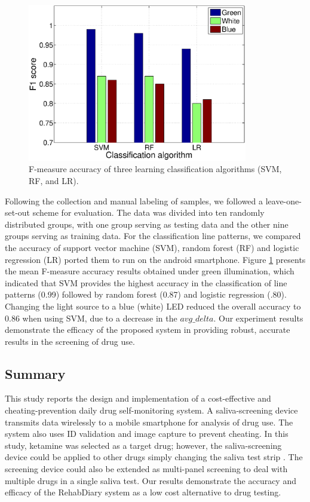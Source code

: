 \begin{figure}[ht]
\begin{center}
\includegraphics[height=6.9cm]{image/ket/detection_accuracy.eps}
\caption{F-measure accuracy of three learning classification algorithms (SVM, RF, and LR).}
\label{fig:detection_accuracy}
\end{center}
\end{figure}

Following the collection and manual labeling of samples, we followed a leave-one-set-out scheme for evaluation. The data was divided into ten randomly distributed groups, with one group serving as testing data and the other nine groups serving as training data. For the classification line patterns, we compared the accuracy of support vector machine (SVM), random forest (RF) and logistic regression (LR) ported them to run on the android smartphone. Figure \ref{fig:detection_accuracy} presents the mean F-measure accuracy results obtained under green illumination, which indicated that SVM provides the highest accuracy in the classification of line patterns (0.99) followed by random forest (0.87) and logistic regression (.80). Changing the light source to a blue (white) LED reduced the overall accuracy to 0.86 when using SVM, due to a decrease in the $avg\_delta$. Our experiment results demonstrate the efficacy of the proposed system in providing robust, accurate results in the screening of drug use.

\subsection{Summary}
This study reports the design and implementation of a cost-effective and cheating-prevention daily drug self-monit\-oring system. A saliva-screening device transmits data wirelessly to a mobile smartphone for analysis of drug use. The system also uses ID validation and image capture to prevent cheating.
In this study, ketamine was selected as a target drug; however, the saliva-screening device could be applied to other drugs simply changing the saliva test strip \cite{drugscan}. The screening device could also be extended as multi-panel screening to deal with multiple drugs in a single saliva test. Our results demonstrate the accuracy and efficacy of the RehabDiary system as a low cost alternative to drug testing.

\let\cleardoublepage\clearpage
